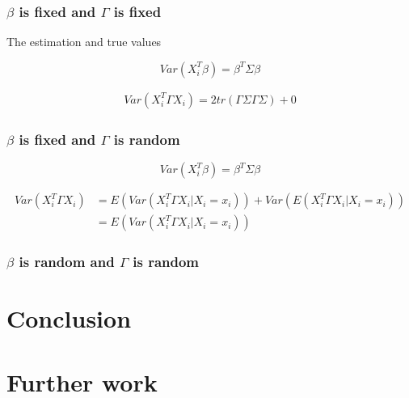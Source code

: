 \documentclass[]{article}
\begin{document}
\subsubsection{\texorpdfstring{\(\beta\) is fixed and \(\Gamma\) is
fixed}{\textbackslash{}beta is fixed and \textbackslash{}Gamma is fixed}}\label{beta-is-fixed-and-gamma-is-fixed}

The estimation and true values

\[
    Var(X_i^T\beta) = \beta^T \Sigma \beta
\]

\begin{align*}
    Var(X_i^T\Gamma X_i) = 2tr(\Gamma \Sigma \Gamma \Sigma) + 0
\end{align*}

\subsubsection{\texorpdfstring{\(\beta\) is fixed and \(\Gamma\) is
random}{\textbackslash{}beta is fixed and \textbackslash{}Gamma is random}}\label{beta-is-fixed-and-gamma-is-random}

\[
    Var(X_i^T\beta) = \beta^T \Sigma \beta
\]

\begin{align*}
    Var(X_i^T\Gamma X_i) &= E(Var(X_i^T\Gamma X_i|X_i = x_i)) + Var(E(X_i^T\Gamma X_i|X_i = x_i)) \\ 
                         &= E(Var(X_i^T\Gamma X_i|X_i = x_i))
\end{align*}

\subsubsection{\texorpdfstring{\(\beta\) is random and \(\Gamma\) is
random}{\textbackslash{}beta is random and \textbackslash{}Gamma is random}}\label{beta-is-random-and-gamma-is-random}

\section{Conclusion}\label{conclusion}

\section{Further work}\label{further-work}
\end{document}
